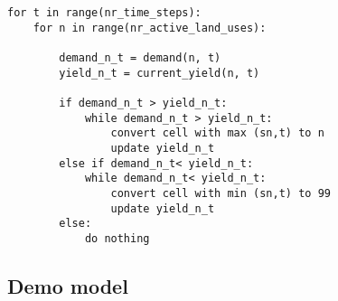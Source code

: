 \documentclass[a4paper,12pt]{article}
\begin{document}
\begin{lstlisting}
for t in range(nr_time_steps):
    for n in range(nr_active_land_uses):

        demand_n_t = demand(n, t)
        yield_n_t = current_yield(n, t)

        if demand_n_t > yield_n_t:
            while demand_n_t > yield_n_t:
                convert cell with max (sn,t) to n
                update yield_n_t
        else if demand_n_t< yield_n_t:
            while demand_n_t< yield_n_t:
                convert cell with min (sn,t) to 99
                update yield_n_t
        else:
            do nothing
\end{lstlisting}


\subsection{Demo model}






\end{document}
